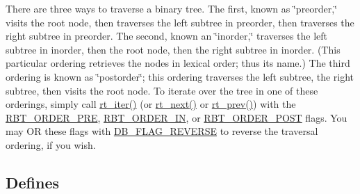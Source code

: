 There are three ways to traverse a binary tree. The first, known as \char`\"{}preorder,\char`\"{} visits the root node, then traverses the left subtree in preorder, then traverses the right subtree in preorder. The second, known an \char`\"{}inorder,\char`\"{} traverses the left subtree in inorder, then the root node, then the right subtree in inorder. (This particular ordering retrieves the nodes in lexical order; thus its name.) The third ordering is known as \char`\"{}postorder\char`\"{}; this ordering traverses the left subtree, the right subtree, then visits the root node. To iterate over the tree in one of these orderings, simply call \hyperlink{group__dbprim__rbtree_a11}{rt\_\-iter()} (or \hyperlink{group__dbprim__rbtree_a10}{rt\_\-next()} or \hyperlink{group__dbprim__rbtree_a24}{rt\_\-prev()}) with the \hyperlink{group__dbprim__rbtree_a21}{RBT\_\-ORDER\_\-PRE}, \hyperlink{group__dbprim__rbtree_a22}{RBT\_\-ORDER\_\-IN}, or \hyperlink{group__dbprim__rbtree_a23}{RBT\_\-ORDER\_\-POST} flags. You may OR these flags with \hyperlink{group__dbprim_a4}{DB\_\-FLAG\_\-REVERSE} to reverse the traversal ordering, if you wish. \subsection*{Defines}
